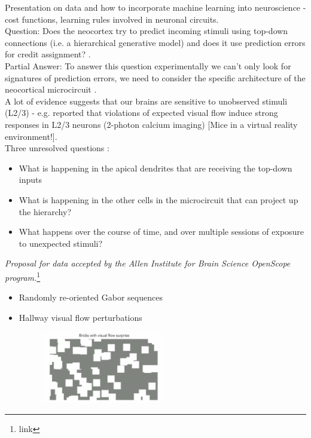 \documentclass[12pt]{article}
\begin{document}
Presentation on data and how to incorporate machine learning into neuroscience - cost functions, learning rules involved in neuronal circuits. \\

Question: Does the neocortex try to predict incoming stimuli using top-down connections (i.e. a hierarchical generative model) and does it use prediction errors for credit assignment? \cite{Lotter16}. \\

Partial Answer: To answer this question experimentally we can't only look for signatures of prediction errors, we need to consider the specific architecture of the neocortical microcircuit \cite{Harris13}. \\

A lot of evidence suggests that our brains are sensitive to unobserved stimuli (L2/3) - e.g. \cite{Zmarz16, Homann17} reported that violations of expected visual flow induce strong responses in L2/3 neurons (2-photon calcium imaging) [Mice in a virtual reality environment!]. \\

Three unresolved questions \cite{Harris13}:
\begin{itemize}
    \item What is happening in the apical dendrites that are receiving the top-down inputs
    \item What is happening in the other cells in the microcircuit that can project up the hierarchy?
    \item What happens over the course of time, and over multiple sessions of exposure to unexpected stimuli?
\end{itemize}

\textit{Proposal for data accepted by the Allen Institute for Brain Science OpenScope program.}\footnote{link}
 \begin{itemize}
     \item Randomly re-oriented Gabor sequences
     \item Hallway visual flow perturbations
     \begin{figure}
  \centering
      \includegraphics[width=0.5\textwidth]{images/hallway.png}
  \caption{}
\end{figure}
 \end{itemize}
 
\end{document}
